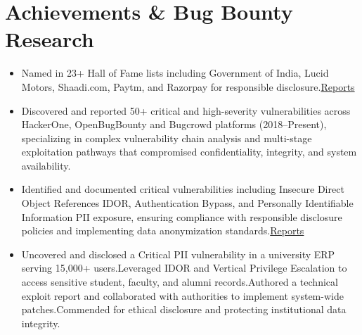 \documentclass[10pt,a4paper]{article}
\begin{document}
\section{Achievements \& Bug Bounty Research}
\begin{itemize}
    \item  Named in 23+ Hall of Fame lists including Government of India, Lucid Motors, Shaadi.com, Paytm, and Razorpay for responsible disclosure.\hfill \href{https://drive.google.com/drive/folders/1yfNNksGZljp8W-uQMPWeilCP8JtXR2My?usp=sharing} {Reports}
    \item  Discovered and reported 50+ critical and high-severity vulnerabilities across HackerOne, OpenBugBounty and Bugcrowd platforms (2018–Present), specializing in complex vulnerability chain analysis and multi-stage exploitation pathways that compromised confidentiality, integrity, and system availability.
    \item Identified and documented critical vulnerabilities including Insecure Direct Object References IDOR, Authentication Bypass, and Personally Identifiable Information PII exposure, ensuring compliance with responsible disclosure policies and implementing data anonymization standards.\hfill \href{https://drive.google.com/drive/folders/1yfNNksGZljp8W-uQMPWeilCP8JtXR2My?usp=sharing}{Reports}
    \item Uncovered and disclosed a Critical PII vulnerability in a university ERP serving 15,000+ users.Leveraged IDOR and Vertical Privilege Escalation to access sensitive student, faculty, and alumni records.Authored a technical exploit report and collaborated with authorities to implement system-wide patches.Commended for ethical disclosure and protecting institutional data integrity.
\end{itemize}
\end{document}
